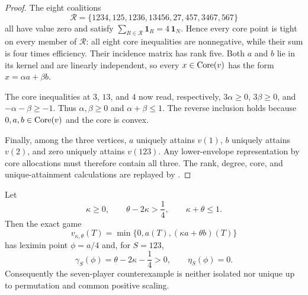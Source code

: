 \begin{proof}
The eight coalitions
\[
 \mathcal R=\{1234,125,1236,13456,27,457,3467,567\}
\]
all have value zero and satisfy
$\sum_{R\in\mathcal R}\mathbf1_R=4\,\mathbf1_N$.  Hence every core point is
tight on every member of $\mathcal R$: all eight core inequalities are
nonnegative, while their sum is four times efficiency.  Their incidence
matrix has rank five.  Both $a$ and $b$ lie in its kernel and are linearly
independent, so every $x\in\operatorname{Core}(v)$ has the form $x=\alpha a+\beta b$.

The core inequalities at $3$, $13$, and $4$ now read, respectively,
$3\alpha\geq0$, $3\beta\geq0$, and
$-\alpha-\beta\geq-1$.  Thus
$\alpha,\beta\geq0$ and $\alpha+\beta\leq1$.  The reverse inclusion holds
because $0,a,b\in\operatorname{Core}(v)$ and the core is convex.

Finally, among the three vertices, $a$ uniquely attains $v(1)$, $b$ uniquely
attains $v(2)$, and zero uniquely attains $v(123)$.  Any lower-envelope
representation by core allocations must therefore contain all three.
The rank, degree, core, and unique-attainment calculations are replayed by
.
\end{proof}

\begin{proposition}
\label{prop:lx-n7-carrier-family}
Let
\[
 \kappa\geq0,
 \qquad \theta-2\kappa>\frac14,
 \qquad \kappa+\theta\leq1.
\]
Then the exact game
\[
 v_{\kappa,\theta}(T)
 =\min\{0,a(T),(\kappa a+\theta b)(T)\}
\]
has leximin point $\phi=a/4$ and, for $S=123$,
\[
 \gamma_S(\phi)=\theta-2\kappa-\frac14>0,
 \qquad \eta_S(\phi)=0.
\]
Consequently the seven-player counterexample is neither isolated nor unique
up to permutation and common positive scaling.
\end{proposition}

